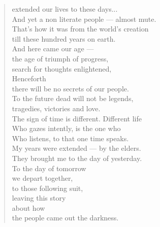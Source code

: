 \documentclass[smalldemyvopaper,11pt,twoside,onecolumn,openright,extrafontsizes]{memoir}
\begin{document}
\begin{verse}
extended our lives to these days...\\
And yet a non literate people — almost mute.\\
That's how it was from the world's creation\\
till these hundred years on earth.\\
And here came our age —\\
the age of triumph of progress,\\
search for thoughts enlightened, \\
Henceforth\\
there will be no secrets of our people.\\
To the future dead will not be legends,\\
tragedies, victories and love.\\
The sign of time is different. Different life \\
Who gazes intently, is the one who \\ 
Who listens, to that one time speaks.\\
My years were extended — by the elders.\\
They brought me to the day of yesterday.\\
To the day of tomorrow\\
we depart together,\\
to those following suit,\\
leaving this story\\
about how\\
the people came out the darkness.
\end{verse}

\clearpage
\tableofcontents

\mainmatter
\end{document}
